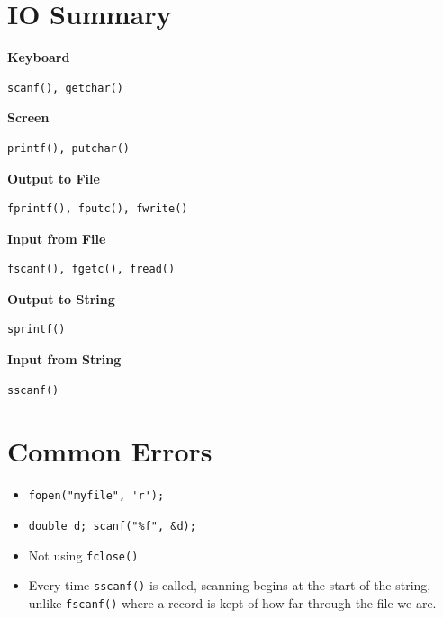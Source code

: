 \documentclass[a4,portraitt]{slides}
\begin{document}
\newpage
{\samepage
\section*{IO Summary}
\vspace{-1.5em}
{\large \bf Keyboard\\}
\vspace{-1.75em}
\begin{verbatim}
scanf(), getchar()
\end{verbatim}
{\large \bf Screen\\}
\vspace{-1.5em}
\begin{verbatim}
printf(), putchar()
\end{verbatim}
{\large \bf Output to File\\}
\vspace{-1.5em}
\begin{verbatim}
fprintf(), fputc(), fwrite()
\end{verbatim}
{\large \bf Input from File\\}
\vspace{-1.5em}
\begin{verbatim}
fscanf(), fgetc(), fread()
\end{verbatim}
{\large \bf Output to String}
\vspace*{-1.5em}
\begin{verbatim}
sprintf()
\end{verbatim}
{\large \bf Input from String}
\vspace*{-1.5em}
\begin{verbatim}
sscanf()
\end{verbatim}
}



\newpage
\section*{Common Errors}
\begin{itemize}
\item \verb^fopen("myfile", 'r');^
\item \verb^double d; scanf("%f", &d);^
\item Not using \verb^fclose()^
\item Every time \verb^sscanf()^ is called, scanning begins
at the start of the string, unlike \verb^fscanf()^ where
a record is kept of how far through the file we are.
\end{itemize}
\end{document}
